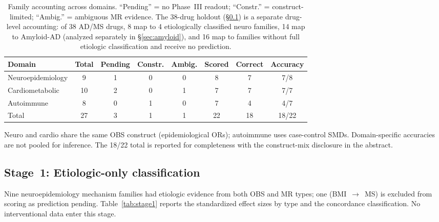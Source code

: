 \documentclass[11pt]{article}
\begin{document}
\begin{table}[t]
\centering
\caption{Family accounting across domains. ``Pending'' = no Phase~III readout; ``Constr.'' = construct-limited; ``Ambig.'' = ambiguous MR evidence. The 38-drug holdout (\S\ref{sec:stage1}) is a separate drug-level accounting: of 38 AD/MS drugs, 8 map to 4 etiologically classified neuro families, 14 map to Amyloid-AD (analyzed separately in \S\ref{sec:amyloid}), and 16 map to families without full etiologic classification and receive no prediction.}
\label{tab:accounting}
\small
\begin{tabular}{lccccccc}
\toprule
Domain & Total & Pending & Constr. & Ambig. & Scored & Correct & Accuracy \\
\midrule
Neuroepidemiology & 9 & 1 & 0 & 0 & 8 & 7 & 7/8 \\
Cardiometabolic & 10 & 2 & 0 & 1 & 7 & 7 & 7/7 \\
Autoimmune & 8 & 0 & 1 & 0 & 7 & 4 & 4/7 \\
\midrule
Total & 27 & 3 & 1 & 1 & 22 & 18 & 18/22 \\
\bottomrule
\end{tabular}

\vspace{1mm}
{\footnotesize
Neuro and cardio share the same OBS construct (epidemiological ORs); autoimmune uses case-control SMDs. Domain-specific accuracies are not pooled for inference. The 18/22 total is reported for completeness with the construct-mix disclosure in the abstract.}
\end{table}

\subsection{Stage~1: Etiologic-only classification}
\label{sec:stage1}

Nine neuroepidemiology mechanism families had etiologic evidence from both OBS and MR types; one (BMI~$\to$~MS) is excluded from scoring as prediction pending. Table~\ref{tab:stage1} reports the standardized effect sizes by type and the concordance classification. No interventional data enter this stage.
\end{document}
